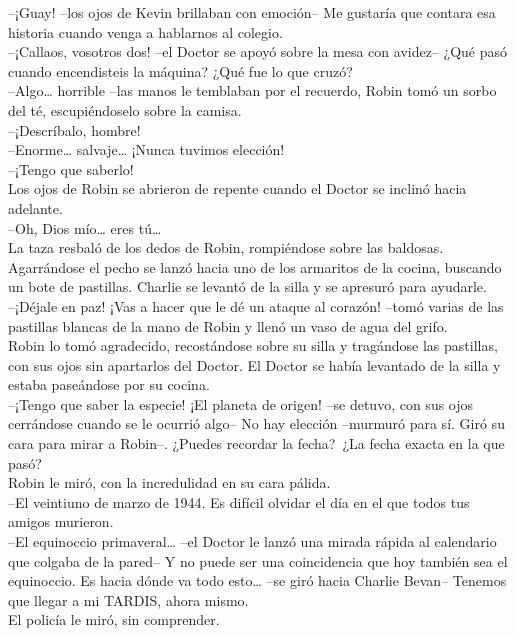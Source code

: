 --¡Guay! --los ojos de Kevin brillaban con emoción-- Me gustaría que
contara esa historia cuando venga a hablarnos al colegio.\\
--¡Callaos, vosotros dos! --el Doctor se apoyó sobre la mesa con
avidez-- ¿Qué pasó cuando encendisteis la máquina? ¿Qué fue lo que
cruzó?\\
--Algo\ldots{} horrible --las manos le temblaban por el recuerdo, Robin
tomó un sorbo del té, escupiéndoselo sobre la camisa.\\
--¡Descríbalo, hombre!\\
--Enorme\ldots{} salvaje\ldots{} ¡Nunca tuvimos elección!\\
--¡Tengo que saberlo!\\
Los ojos de Robin se abrieron de repente cuando el Doctor se inclinó
hacia adelante.\\
--Oh, Dios mío\ldots{} eres tú\ldots{}\\
La taza resbaló de los dedos de Robin, rompiéndose sobre las baldosas.
Agarrándose el pecho se lanzó hacia uno de los armaritos de la cocina,
buscando un bote de pastillas. Charlie se levantó de la silla y se
apresuró para ayudarle.\\
--¡Déjale en paz! ¡Vas a hacer que le dé un ataque al corazón! --tomó
varias de las pastillas blancas de la mano de Robin y llenó un vaso de
agua del grifo.\\
Robin lo tomó agradecido, recostándose sobre su silla y tragándose las
pastillas, con sus ojos sin apartarlos del Doctor. El Doctor se había
levantado de la silla y estaba paseándose por su cocina.\\
--¡Tengo que saber la especie! ¡El planeta de origen! --se detuvo, con
sus ojos cerrándose cuando se le ocurrió algo-- No hay elección
--murmuró para sí. Giró su cara para mirar a Robin--. ¿Puedes recordar
la fecha?~¿La fecha exacta en la que pasó?\\
Robin le miró, con la incredulidad en su cara pálida.\\
--El veintiuno de marzo de 1944. Es difícil olvidar el día en el que
todos tus amigos murieron.\\
--El equinoccio primaveral\ldots{} --el Doctor le lanzó una mirada
rápida al calendario que colgaba de la pared-- Y no puede ser una
coincidencia que hoy también sea el equinoccio. Es hacia dónde va todo
esto\ldots{} --se giró hacia Charlie Bevan-- Tenemos que llegar a mi
TARDIS, ahora mismo.\\
El policía le miró, sin comprender.\\
